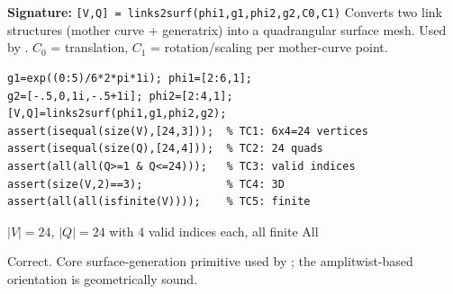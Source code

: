 \chapter{}
\begin{tcolorbox}[Abox,title={Analysis}]
\textbf{Signature:} \lstinline|[V,Q] = links2surf(phi1,g1,phi2,g2,C0,C1)|\quad
Converts two link structures (mother curve + generatrix) into a quadrangular surface mesh. Used by . $C_0$ = translation, $C_1$ = rotation/scaling per mother-curve point.
\end{tcolorbox}
\begin{lstlisting}[caption={Tests for links2surf.m}]
g1=exp((0:5)/6*2*pi*1i); phi1=[2:6,1];
g2=[-.5,0,1i,-.5+1i]; phi2=[2:4,1];
[V,Q]=links2surf(phi1,g1,phi2,g2);
assert(isequal(size(V),[24,3]));  % TC1: 6x4=24 vertices
assert(isequal(size(Q),[24,4]));  % TC2: 24 quads
assert(all(all(Q>=1 & Q<=24)));   % TC3: valid indices
assert(size(V,2)==3);             % TC4: 3D
assert(all(all(isfinite(V))));    % TC5: finite
\end{lstlisting}
\begin{tcolorbox}[Pbox,title={TC1--TC5 -- All pass}]
$|V|=24$, $|Q|=24$ with 4 valid indices each, all finite \quad All \APROVADO
\end{tcolorbox}
\begin{concl}
Correct. Core surface-generation primitive used by ; the amplitwist-based orientation is geometrically sound.
\end{concl}

